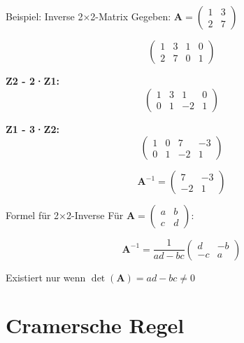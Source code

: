 \documentclass[a4paper, fontsize=7pt]{scrartcl}
\begin{document}
\begin{subbox}{Beispiel: Inverse 2×2-Matrix}
Gegeben: $\mathbf{A} = \begin{pmatrix} 1 & 3 \\ 2 & 7 \end{pmatrix}$

$$\left(\begin{array}{cc|cc}
1 & 3 & 1 & 0 \\
2 & 7 & 0 & 1
\end{array}\right)$$

\textbf{Z2 - 2·Z1:}
$$\left(\begin{array}{cc|cc}
1 & 3 & 1 & 0 \\
0 & 1 & -2 & 1
\end{array}\right)$$

\textbf{Z1 - 3·Z2:}
$$\left(\begin{array}{cc|cc}
1 & 0 & 7 & -3 \\
0 & 1 & -2 & 1
\end{array}\right)$$

$$\mathbf{A}^{-1} = \begin{pmatrix} 7 & -3 \\ -2 & 1 \end{pmatrix}$$
\end{subbox}

\begin{subbox}{Formel für 2×2-Inverse}
Für $\mathbf{A} = \begin{pmatrix} a & b \\ c & d \end{pmatrix}$:

$$\mathbf{A}^{-1} = \frac{1}{ad - bc} \begin{pmatrix} d & -b \\ -c & a \end{pmatrix}$$

Existiert nur wenn $\det(\mathbf{A}) = ad - bc \neq 0$
\end{subbox}

\section{Cramersche Regel}
\end{document}
